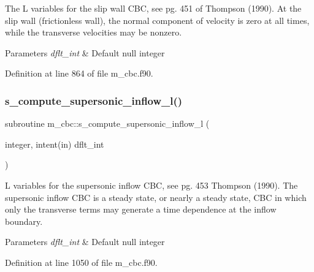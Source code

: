 The L variables for the slip wall C\+BC, see pg. 451 of Thompson (1990). At the slip wall (frictionless wall), the normal component of velocity is zero at all times, while the transverse velocities may be nonzero. 


\begin{DoxyParams}{Parameters}
{\em dflt\+\_\+int} & Default null integer \\
\hline
\end{DoxyParams}


Definition at line 864 of file m\+\_\+cbc.\+f90.

\mbox{\label{namespacem__cbc_aef459892802977978a425cd85648c706}} 
\subsubsection{\texorpdfstring{s\+\_\+compute\+\_\+supersonic\+\_\+inflow\+\_\+l()}{s\_compute\_supersonic\_inflow\_l()}}
{\footnotesize\ttfamily subroutine m\+\_\+cbc\+::s\+\_\+compute\+\_\+supersonic\+\_\+inflow\+\_\+l (\begin{DoxyParamCaption}\item[{integer, intent(in)}]{dflt\+\_\+int }\end{DoxyParamCaption})}



L variables for the supersonic inflow C\+BC, see pg. 453 Thompson (1990). The supersonic inflow C\+BC is a steady state, or nearly a steady state, C\+BC in which only the transverse terms may generate a time dependence at the inflow boundary. 


\begin{DoxyParams}{Parameters}
{\em dflt\+\_\+int} & Default null integer \\
\hline
\end{DoxyParams}


Definition at line 1050 of file m\+\_\+cbc.\+f90.

\mbox{\label{namespacem__cbc_a95f3cad9b9fec4f08b561da8f0db6584}} 
